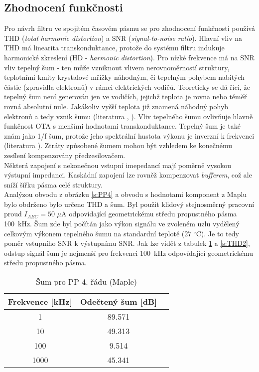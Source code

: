 \subsection{Zhodnocení funkčnosti}
\noindent Pro návrh filtru ve spojitém časovém  pásmu se pro zhodnocení funkčnosti používá THD (\textit{total harmonic distortion}) a SNR (\textit{signal-to-noise ratio}). Hlavní vliv na THD má linearita transkonduktance, protože do systému filtru indukuje harmonické zkreslení (HD - \textit{harmonic distortion}). Pro nízké frekvence má na SNR vliv tepelný šum - ten může vzniknout vlivem nerovnoměrností struktury, teplotními kmity krystalové mřížky náhodným, či tepelným pohybem nabitých částic (zpravidla elektronů) v rámci elektrických vodičů. Teoreticky se dá říci, že tepelný šum není generován jen ve vodičích, jejichž teplota je rovna nebo téměř rovná absolutní nule. Jakákoliv vyšší teplota již znamená náhodný pohyb elektronů a tedy vznik šumu (literatura \cite{20}, \cite{21}). Vliv tepelného šumu ovlivňuje hlavně funkčnost OTA s menšími hodnotami transkonduktance. Tepelný šum je také znám jako 1/f šum, protože jeho spektrální hustota výkonu je inverzní k frekvenci (literatura \cite{2}). Ztráty způsobené šumem mohou být vzhledem ke konečnému zesílení kompenzovány předzesilovačem. \\
Některá zapojení s nekonečnou vstupní imepedancí mají poměrně vysokou výstupní impedanci. Kaskádní zapojení lze rovněž kompenzovat \textit{bufferem}, což ale sníží šířku pásma celé struktury.\\
Analýzou obvodu z obrázku \ref{s:PP4} a obvodu s hodnotami komponent z Maplu bylo obdrženo bylo určeno THD a šum. Byl použit klidový stejnosměrný pracovní proud $I_{ABC} = 50$ $\mu$A odpovídající geometrickému středu propustného pásma 100~kHz. Šum zde byl počítán jako výkon signálu ve zvoleném uzlu vydělený celkovým výkonem tepelného šumu na standardní teplotě (27 $^{\circ}$C). Je to tedy poměr vstupního SNR k výstupnímu SNR. Jak lze vidět z tabulek \ref{s:THD1} a \ref{s:THD2}, odstup signál šum je nejmenší pro frekvenci 100~kHz odpovídající geometrickému středu propustného pásma.
\begin{table}[h]
\centering
  \begin{tabular}{ | c | c | c |}
    \hline
     Frekvence [kHz] & Odečtený šum [dB] \\ \hline
    1 & 89.571 \\ \hline
    10 & 49.313 \\ \hline
    100 & 9.514 \\ \hline
    1000 & 45.341 \\ \hline
  \end{tabular}
  \caption[Šum pro PP 4. řádu (Maple)]{Šum pro PP 4. řádu (Maple) \label{s:THD1}}
\end{table}
